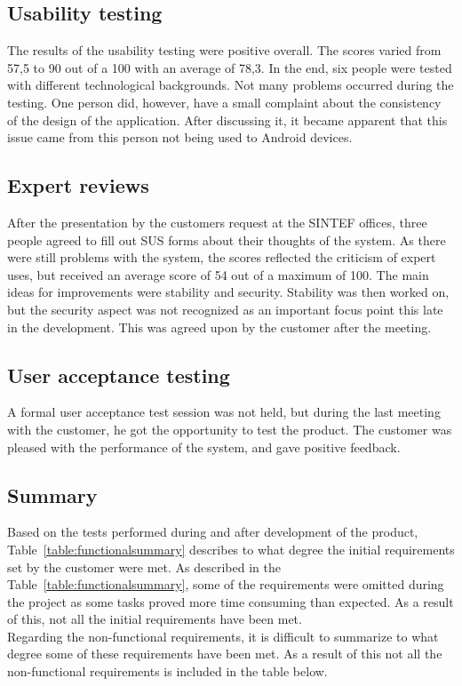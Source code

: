 		\subsection{Usability testing}
		The results of the usability testing were positive overall. The scores varied from 57,5 to 90 out of a 100 with an average of 78,3. In the end, six people were tested with different technological backgrounds. Not many problems  occurred during the testing. One person did, however, have a small complaint about the consistency of the design of the application. After discussing it, it became apparent that this issue came from this person not being used to Android devices. 

		\subsection{Expert reviews}
		After the presentation by the customers request at the SINTEF offices, three people agreed to fill out SUS forms about their thoughts of the system. As there were still problems with the system, the scores reflected the criticism of expert uses, but received an average score of 54 out of a maximum of 100. The main ideas for improvements were stability and security. Stability was then worked on, but the security aspect was not recognized as an important focus point this late in the development. This was agreed upon by the customer after the meeting.

		\subsection{User acceptance testing}
		A formal user acceptance test session was not held, but during the last meeting with the customer, he got the opportunity to test the product. The customer was pleased with the performance of the system, and gave positive feedback.

		\subsection{Summary}
		Based on the tests performed during and after development of the product, Table~\ref{table:functionalsummary} describes to what degree the initial requirements set by the customer were met. As described in the Table~\ref{table:functionalsummary}, some of the requirements were omitted during the project as some tasks proved more time consuming than expected. As a result of this, not all the initial requirements have been met. \\
		\newline
		Regarding the non-functional requirements, it is difficult to summarize to what degree some of these requirements have been met. As a result of this not all the non-functional requirements is included in the table below.


